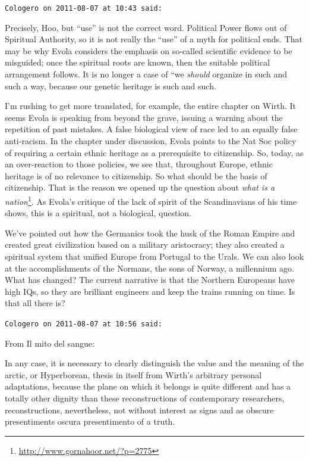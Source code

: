 \begin{footnotesize}
\begin{sffamily}
\hfill

\texttt{Cologero on 2011-08-07 at 10:43 said:}

Precisely, Hoo, but ``use'' is not the correct word. Political Power flows out of Spiritual Authority, so it is not really the ``use'' of a myth for political ends. That may be why Evola considers the emphasis on so-called scientific evidence to be misguided; once the spiritual roots are known, then the suitable political arrangement follows. It is no longer a case of ``we \emph{should} organize in such and such a way, because our genetic heritage is such and such.

I'm rushing to get more translated, for example, the entire chapter on Wirth. It seems Evola is speaking from beyond the grave, issuing a warning about the repetition of past mistakes. A false biological view of race led to an equally false anti-racism. In the chapter under discussion, Evola points to the Nat Soc policy of requiring a certain ethnic heritage as a prerequisite to citizenship. So, today, as an over-reaction to those policies, we see that, throughout Europe, ethnic heritage is of no relevance to citizenship. So what should be the basis of citizenship. That is the reason we opened up the question about \textit{what is a nation}\footnote{\url{http://www.gornahoor.net/?p=2775}}. As Evola's critique of the lack of spirit of the Scandinavians of his time shows, this is a spiritual, not a biological, question.

We've pointed out how the Germanics took the husk of the Roman Empire and created great civilization based on a military aristocracy; they also created a spiritual system that unified Europe from Portugal to the Urals. We can also look at the accomplishments of the Normans, the sons of Norway, a millennium ago. What has changed? The current narrative is that the Northern Europeans have high IQs, so they are brilliant engineers and keep the trains running on time. Is that all there is?

\hfill

\texttt{Cologero on 2011-08-07 at 10:56 said:}

From Il mito del sangue:

\begin{quotex}\footnotesize

In any case, it is necessary to clearly distinguish the value and the meaning of the arctic, or Hyperborean, thesis in itself from Wirth's arbitrary personal adaptations, because the plane on which it belongs is quite different and has a totally other dignity than these reconstructions of contemporary researchers, reconstructions, nevertheless, not without interest as signs and as obscure presentiments oscura presentimento of a truth.
\end{quotex}



\end{sffamily}
\end{footnotesize}
